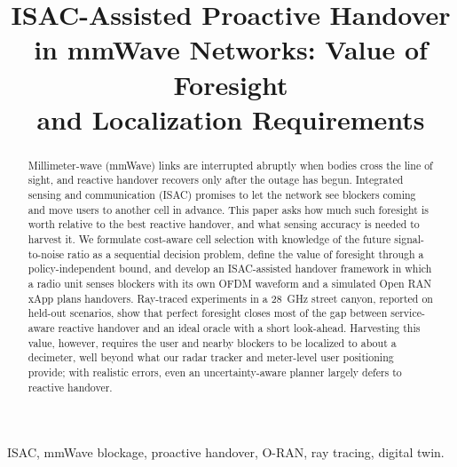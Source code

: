 \documentclass[conference]{IEEEtran}
\begin{document}
\title{ISAC-Assisted Proactive Handover\\
in mmWave Networks: Value of Foresight\\
and Localization Requirements}

\author{
}

\maketitle

\begin{abstract}
Millimeter-wave (mmWave) links are interrupted abruptly when bodies
cross the line of sight, and reactive handover recovers only after the
outage has begun. Integrated sensing and communication (ISAC) promises
to let the network see blockers coming and move users to another cell
in advance. This paper asks how much such foresight is worth relative to
the best reactive handover, and what sensing accuracy is needed to
harvest it. We formulate cost-aware cell selection with knowledge of the
future signal-to-noise ratio as a sequential decision problem, define
the value of foresight through a policy-independent bound, and develop
an ISAC-assisted handover framework in which a radio unit senses
blockers with its own OFDM waveform and a simulated Open RAN xApp
plans handovers. Ray-traced experiments in a \SI{28}{GHz} street canyon,
reported on held-out scenarios, show that perfect foresight closes most
of the gap between service-aware reactive handover and an ideal oracle
with a short look-ahead. Harvesting this value, however, requires the
user and nearby blockers to be localized to about a decimeter, well
beyond what our radar tracker and meter-level user positioning provide;
with realistic errors, even an uncertainty-aware planner largely defers
to reactive handover.
\end{abstract}

\begin{IEEEkeywords}
ISAC, mmWave blockage, proactive handover, O-RAN, ray tracing, digital twin.
\end{IEEEkeywords}

\end{document}

